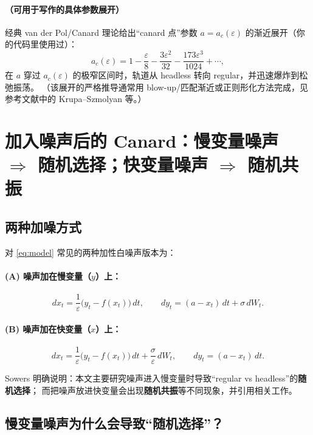	\paragraph{（可用于写作的具体参数展开）}
	经典 van der Pol/Canard 理论给出“canard 点”参数 $a=a_c(\varepsilon)$ 的渐近展开（你的代码里使用过）：
	\[
	a_c(\varepsilon)=1-\frac{\varepsilon}{8}-\frac{3\varepsilon^2}{32}-\frac{173\varepsilon^3}{1024}+\cdots,
	\]
	在 $a$ 穿过 $a_c(\varepsilon)$ 的极窄区间时，轨道从 headless 转向 regular，并迅速爆炸到松弛振荡。
	（该展开的严格推导通常用 blow-up/匹配渐近或正则形化方法完成，见参考文献中的 Krupa--Szmolyan 等。）
	
	\section{加入噪声后的 Canard：慢变量噪声 $\Rightarrow$ 随机选择；快变量噪声 $\Rightarrow$ 随机共振}
	
	\subsection{两种加噪方式}
	对 \eqref{eq:model} 常见的两种加性白噪声版本为：
	
	\paragraph{(A) 噪声加在慢变量（$y$）上：}
	\begin{equation}\label{eq:slow-noise}
		dx_t=\frac{1}{\varepsilon}\bigl(y_t-f(x_t)\bigr)\,dt,\qquad
		dy_t=(a-x_t)\,dt+\sigma\,dW_t .
	\end{equation}
	
	\paragraph{(B) 噪声加在快变量（$x$）上：}
	\begin{equation}\label{eq:fast-noise}
		dx_t=\frac{1}{\varepsilon}\bigl(y_t-f(x_t)\bigr)\,dt+\frac{\sigma}{\varepsilon}\,dW_t,\qquad
		dy_t=(a-x_t)\,dt .
	\end{equation}
	
	Sowers 明确说明：本文主要研究噪声进入慢变量时导致“regular vs headless”的\textbf{随机选择}；
	而把噪声放进快变量会出现\textbf{随机共振}等不同现象，并引用相关工作。%
	
	\subsection{慢变量噪声为什么会导致“随机选择”？}
	
